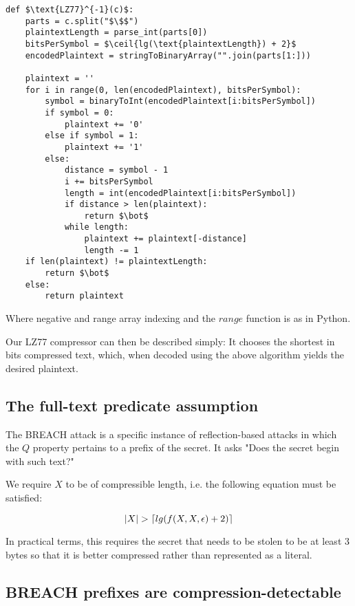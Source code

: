 \documentclass[a4paper, 11 pt, conference]{article}
\DeclarePairedDelimiter{\ceil}{\lceil}{\rceil}
\begin{document}
\begin{lstlisting}[texcl,mathescape]
def $\text{LZ77}^{-1}(c)$:
    parts = c.split("$\$$")
    plaintextLength = parse_int(parts[0])
    bitsPerSymbol = $\ceil{lg(\text{plaintextLength}) + 2}$
    encodedPlaintext = stringToBinaryArray("".join(parts[1:]))

    plaintext = ''
    for i in range(0, len(encodedPlaintext), bitsPerSymbol):
        symbol = binaryToInt(encodedPlaintext[i:bitsPerSymbol])
        if symbol = 0:
            plaintext += '0'
        else if symbol = 1:
            plaintext += '1'
        else:
            distance = symbol - 1
            i += bitsPerSymbol
            length = int(encodedPlaintext[i:bitsPerSymbol])
            if distance > len(plaintext):
                return $\bot$
            while length:
                plaintext += plaintext[-distance]
                length -= 1
    if len(plaintext) != plaintextLength:
        return $\bot$
    else:
        return plaintext
\end{lstlisting}

Where negative and range array indexing and the $range$ function is as in
Python.

Our LZ77 compressor can then be described simply: It chooses the shortest in
bits compressed text, which, when decoded using the above algorithm yields the
desired plaintext.


\subsection{The full-text predicate assumption}\label{subsec:fulltextassumption}

The BREACH attack is a specific instance of reflection-based attacks in which
the $Q$ property pertains to a prefix of the secret. It asks "Does the secret
begin with such text?"

We require $X$ to be of compressible length,
i.e. the following equation must be satisfied:

\begin{equation*}
    |X| > \ceil{lg(f(X, X, \epsilon) + 2)}
\end{equation*}

In practical terms, this requires the secret that needs to be stolen to be at
least 3 bytes so that it is better compressed rather than represented as a
literal.

\subsection{BREACH prefixes are
compression-detectable}\label{subsec:breachprefix}
\end{document}
